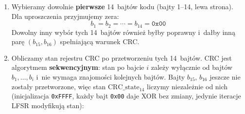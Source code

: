 \documentclass[12pt,a4paper]{article}
\begin{document}
\begin{enumerate}[label=\arabic*.]
  \item Wybieramy dowolnie \textbf{pierwsze} 14~bajtów kodu
        (bajty 1–14, lewa strona). Dla uproszczenia przyjmujemy zera:
        \[
          b_1 = b_2 = \cdots = b_{14} = \texttt{0x00}
        \]
        Dowolny inny wybór tych 14~bajtów również byłby poprawny
        i~dałby inną parę $(b_{15}, b_{16})$ spełniającą warunek CRC.
  \item Obliczamy stan rejestru CRC po przetworzeniu tych 14~bajtów.
        CRC jest algorytmem \textbf{sekwencyjnym}: stan po bajcie $i$ zależy
        wyłącznie od bajtów $b_1, \ldots, b_i$ i~nie wymaga znajomości
        kolejnych bajtów. Bajty $b_{15}$, $b_{16}$ jeszcze nie zostały
        przetworzone, więc stan $\mathrm{CRC\_state}_{14}$ liczymy
        niezależnie od nich
        (inicjalizacja \texttt{0xFFFF}, każdy bajt \texttt{0x00} daje XOR
        bez zmiany, jedynie iteracje LFSR modyfikują stan):


\end{enumerate}
\end{document}
